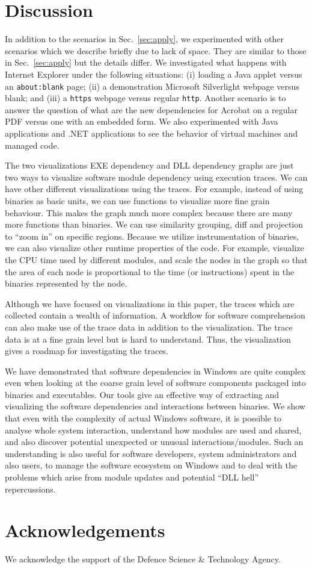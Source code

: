 \section{Discussion}

In addition to the scenarios in Sec.~\ref{sec:apply},
we experimented with other scenarios which we describe briefly due to lack
of space. They are similar to those in Sec.~\ref{sec:apply} but the details differ.
We investigated what happens with Internet Explorer under
the following situations:
(i) loading a Java applet versus an {\tt about:blank} page;
(ii) a demonstration Microsoft Silverlight webpage versus blank; and
(iii) a {\tt https} webpage versus regular {\tt http}.
Another scenario is to answer the question of
what are the new dependencies for Acrobat on a regular PDF versus
one with an embedded form.
We also experimented with Java applications and .NET applications
to see the behavior of virtual machines and managed code.

The two visualizations EXE dependency and DLL dependency graphs are just two
ways to visualize software module dependency using execution traces.
We can have other different visualizations using the traces.
For example, instead of using binaries as basic units, we can use functions
to visualize more fine grain behaviour.
This makes the graph much more complex because there are many more functions
than binaries.
We can use similarity grouping, diff and projection to ``zoom in''
on specific regions.
Because we utilize instrumentation of binaries, we can also visualize other runtime
properties of the code.
For example, visualize the CPU time used by different modules,
and scale the nodes in the graph so that the area of each node is proportional to the time
(or instructions) spent in the binaries represented by the node.

Although we have focused on visualizations in this paper, the traces which are collected
contain a wealth of information. A workflow for software comprehension can also make use
of the trace data in addition to the visualization.
The trace data is at a fine grain level but is hard to understand.
Thus, the visualization gives a roadmap for investigating the traces.

We have demonstrated that software dependencies in Windows are quite
complex even when looking at the coarse grain level of software components
packaged into binaries and executables.
Our tools give an effective way of extracting and
visualizing the software dependencies and interactions between binaries.
We show that even with the complexity of actual Windows software,
it is possible to analyse whole system interaction,
understand how modules are used and shared,
and also discover potential unexpected or unusual interactions/modules.
Such an understanding is also useful for software developers,
system administrators and also users, to manage the
software ecosystem on Windows and to deal with the problems which arise
from module updates and potential ``DLL hell'' repercussions.

\section{Acknowledgements}

We acknowledge the support of the Defence Science \& Technology Agency.


